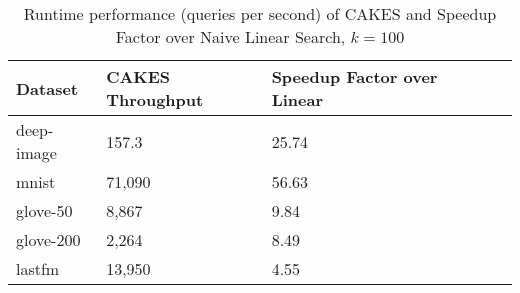\begin{table*}[!t]
    \caption{Runtime performance (queries per second) of CAKES and Speedup Factor over Naive Linear Search, $k=100$}
    \label{table:results:ann-alt-100}
    \vskip 0.15in
    \begin{center}
        \begin{small}
            \begin{sc}
                \begin{tabular}{|l|l|l|l|l|l|}
                    \hline
                    \textbf{Dataset} & \textbf{CAKES Throughput} & \textbf{Speedup Factor over Linear} \\
                    \hline
                    deep-image        & 157.3                    & 25.74                               \\                            
                    \hline
                    mnist             & 71,090                   & 56.63                               \\
                    \hline
                    glove-50          & 8,867                    & 9.84                                \\
                    \hline 
                    glove-200         & 2,264                    & 8.49                                \\
                    \hline
                    lastfm            & 13,950                   & 4.55                                \\
                    \hline
                \end{tabular}
            \end{sc}
        \end{small}
    \end{center}
    \vskip -0.1in
\end{table*}
